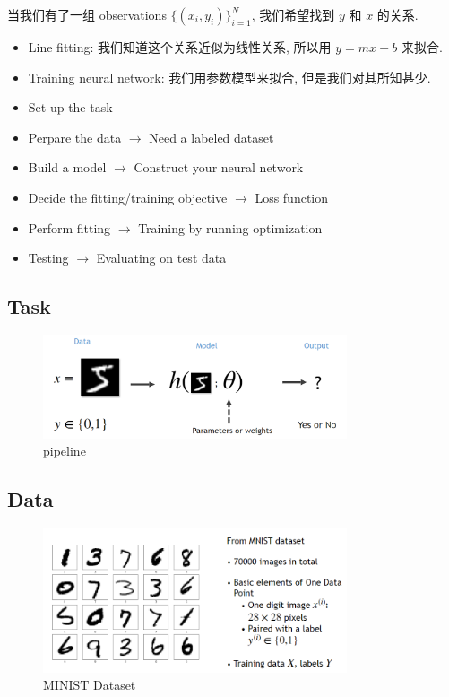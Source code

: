 当我们有了一组 observations $\{(x_i, y_i)\}_{i=1}^N$, 我们希望找到 $y$ 和 $x$ 的关系.
\begin{itemize}
    \item Line fitting: 我们知道这个关系近似为线性关系, 所以用 $y = mx + b$ 来拟合.
    \item Training neural network: 我们用参数模型来拟合, 但是我们对其所知甚少.
\end{itemize}
\begin{definition}[Outline]
    \begin{itemize}
        \item Set up the task
        \item Perpare the data $\to$ Need a labeled dataset
        \item Build a model $\to$ Construct your neural network
        \item Decide the fitting/training objective $\to$ Loss function
        \item Perform fitting $\to$ Training by running optimization
        \item Testing $\to$ Evaluating on test data
    \end{itemize}
\end{definition}

\subsection{Task}
\begin{figure}[htbp]
    \centering
    \includegraphics[width=0.8\textwidth]{figures/ministdataset.png}
    \caption{pipeline}
    \label{fig:ml-pipeline}
\end{figure}

\clearpage

\subsection{Data}

\begin{figure}[htbp]
    \centering
    \includegraphics[width=0.8\textwidth]{figures/Mnistdataset.png}
    \caption{MINIST Dataset}
    \label{fig:ml-dataset}
\end{figure}

